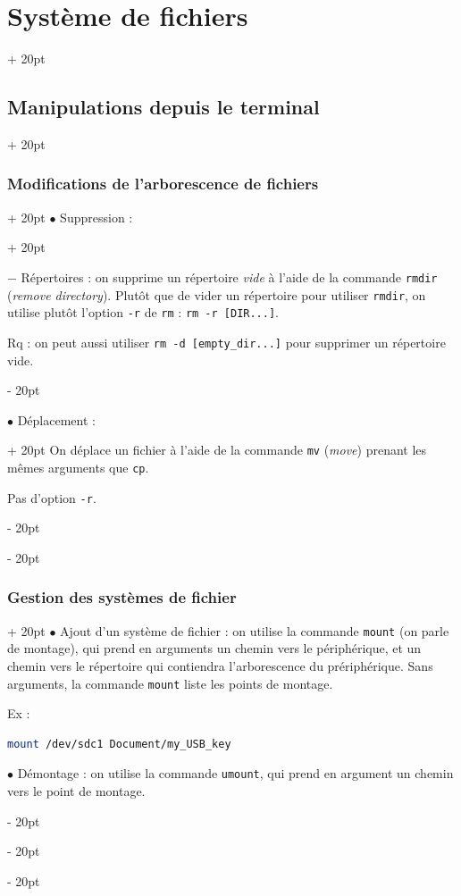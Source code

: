 \documentclass[a4paper, 12pt, twoside]{article}
\renewcommand{\em}{\color{ff4500}}
\newcommand{\ind}[1][20pt]{\advance\leftskip + #1}
\newcommand{\deind}[1][20pt]{\advance\leftskip - #1}
\newenvironment{indentedenv}[1][20pt]{\par \ind[#1]}{\par \deind}
\newenvironment{indt}[2][20pt]{#2 \begin{indentedenv}[#1]}{\end{indentedenv}} %
\begin{document}
\begin{indt}{\section{Système de fichiers}}
\begin{indt}{\subsection{Manipulations depuis le terminal}}
\begin{indt}{\subsubsection{Modifications de l'arborescence de fichiers}}
\begin{indt}{$\bullet$ Suppression :}
                    \vspace{12pt}
                    
                    $-$ Répertoires : on supprime un répertoire \textit{vide} à l'aide de la commande \texttt{rmdir} (\textit{remove directory}). Plutôt que de vider un répertoire pour utiliser \texttt{rmdir}, on utilise plutôt l'option \texttt{-r} de \texttt{rm} : \texttt{\em rm -r [DIR...]}.
                    
                    Rq : on peut aussi utiliser \texttt{rm -d [empty\_dir...]} pour supprimer un répertoire vide.
                \end{indt}
                
                \vspace{12pt}
                
                \begin{indt}{$\bullet$ Déplacement :}
                    On déplace un fichier à l'aide de la commande \texttt{\em mv} (\textit{move}) prenant les mêmes arguments que \texttt{cp}.
                    
                    Pas d'option \texttt{-r}.
                \end{indt}
            \end{indt}
            
            \vspace{12pt}
            
            \begin{indt}{\subsubsection{Gestion des systèmes de fichier}}
                $\bullet$ Ajout d'un système de fichier : on utilise la commande \texttt{mount} (on parle de montage), qui prend en arguments un chemin vers le périphérique, et un chemin vers le répertoire qui contiendra l'arborescence du prériphérique.
                Sans arguments, la commande \texttt{mount} liste les points de montage.
                
                Ex :
                \begin{lstlisting}[language=Bash, xleftmargin=80pt]
mount /dev/sdc1 Document/my_USB_key\end{lstlisting}
                
                \vspace{12pt}
                
                $\bullet$ Démontage : on utilise la commande \texttt{umount}, qui prend en argument un chemin vers le point de montage.
            \end{indt}
            

\end{indt}
\end{indt}
\end{document}
